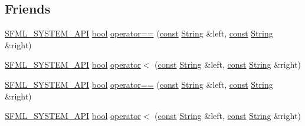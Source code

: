 \subsection*{Friends}
\begin{DoxyCompactItemize}
\item 
\hyperlink{sfml_2dep_2_s_f_m_l-2_84_82_2include_2_s_f_m_l_2_system_2_export_8hpp_a6476c9e422606477a4c23d92b1d79a1f}{S\-F\-M\-L\-\_\-\-S\-Y\-S\-T\-E\-M\-\_\-\-A\-P\-I} \hyperlink{term__entry_8h_a002004ba5d663f149f6c38064926abac}{bool} \hyperlink{classsf_1_1_string_a2a385459fa9a237e61a712fa956d489e}{operator==} (\hyperlink{term__entry_8h_a57bd63ce7f9a353488880e3de6692d5a}{const} \hyperlink{classsf_1_1_string}{String} \&left, \hyperlink{term__entry_8h_a57bd63ce7f9a353488880e3de6692d5a}{const} \hyperlink{classsf_1_1_string}{String} \&right)
\item 
\hyperlink{sfml_2dep_2_s_f_m_l-2_84_82_2include_2_s_f_m_l_2_system_2_export_8hpp_a6476c9e422606477a4c23d92b1d79a1f}{S\-F\-M\-L\-\_\-\-S\-Y\-S\-T\-E\-M\-\_\-\-A\-P\-I} \hyperlink{term__entry_8h_a002004ba5d663f149f6c38064926abac}{bool} \hyperlink{classsf_1_1_string_ac2ca5a7703402a2bbafd85eec6d1e846}{operator$<$} (\hyperlink{term__entry_8h_a57bd63ce7f9a353488880e3de6692d5a}{const} \hyperlink{classsf_1_1_string}{String} \&left, \hyperlink{term__entry_8h_a57bd63ce7f9a353488880e3de6692d5a}{const} \hyperlink{classsf_1_1_string}{String} \&right)
\item 
\hyperlink{sfml_2dep_2_s_f_m_l-2_84_82_2include_2_s_f_m_l_2_system_2_export_8hpp_a6476c9e422606477a4c23d92b1d79a1f}{S\-F\-M\-L\-\_\-\-S\-Y\-S\-T\-E\-M\-\_\-\-A\-P\-I} \hyperlink{term__entry_8h_a002004ba5d663f149f6c38064926abac}{bool} \hyperlink{classsf_1_1_string_a2a385459fa9a237e61a712fa956d489e}{operator==} (\hyperlink{term__entry_8h_a57bd63ce7f9a353488880e3de6692d5a}{const} \hyperlink{classsf_1_1_string}{String} \&left, \hyperlink{term__entry_8h_a57bd63ce7f9a353488880e3de6692d5a}{const} \hyperlink{classsf_1_1_string}{String} \&right)
\item 
\hyperlink{sfml_2dep_2_s_f_m_l-2_84_82_2include_2_s_f_m_l_2_system_2_export_8hpp_a6476c9e422606477a4c23d92b1d79a1f}{S\-F\-M\-L\-\_\-\-S\-Y\-S\-T\-E\-M\-\_\-\-A\-P\-I} \hyperlink{term__entry_8h_a002004ba5d663f149f6c38064926abac}{bool} \hyperlink{classsf_1_1_string_ac2ca5a7703402a2bbafd85eec6d1e846}{operator$<$} (\hyperlink{term__entry_8h_a57bd63ce7f9a353488880e3de6692d5a}{const} \hyperlink{classsf_1_1_string}{String} \&left, \hyperlink{term__entry_8h_a57bd63ce7f9a353488880e3de6692d5a}{const} \hyperlink{classsf_1_1_string}{String} \&right)
\end{DoxyCompactItemize}
